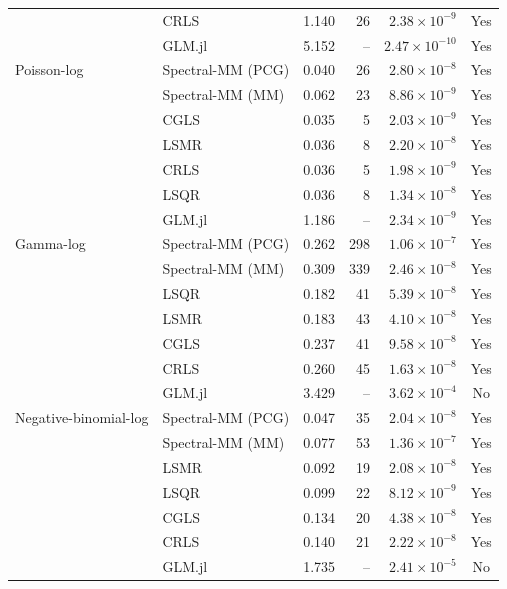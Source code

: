 \begin{table}[htbp]
\begin{tabular}{llrrrc}
 & CRLS & 1.140 & 26 & $2.38\times10^{-9}$ & Yes \\
 & GLM.jl & 5.152 & -- & $2.47\times10^{-10}$ & Yes \\
\midrule
Poisson-log & Spectral-MM (PCG) & 0.040 & 26 & $2.80\times10^{-8}$ & Yes \\
 & Spectral-MM (MM) & 0.062 & 23 & $8.86\times10^{-9}$ & Yes \\
 & CGLS & 0.035 & 5 & $2.03\times10^{-9}$ & Yes \\
 & LSMR & 0.036 & 8 & $2.20\times10^{-8}$ & Yes \\
 & CRLS & 0.036 & 5 & $1.98\times10^{-9}$ & Yes \\
 & LSQR & 0.036 & 8 & $1.34\times10^{-8}$ & Yes \\
 & GLM.jl & 1.186 & -- & $2.34\times10^{-9}$ & Yes \\
\midrule
Gamma-log & Spectral-MM (PCG) & 0.262 & 298 & $1.06\times10^{-7}$ & Yes \\
 & Spectral-MM (MM) & 0.309 & 339 & $2.46\times10^{-8}$ & Yes \\
 & LSQR & 0.182 & 41 & $5.39\times10^{-8}$ & Yes \\
 & LSMR & 0.183 & 43 & $4.10\times10^{-8}$ & Yes \\
 & CGLS & 0.237 & 41 & $9.58\times10^{-8}$ & Yes \\
 & CRLS & 0.260 & 45 & $1.63\times10^{-8}$ & Yes \\
 & GLM.jl & 3.429 & -- & $3.62\times10^{-4}$ & No \\
\midrule
Negative-binomial-log & Spectral-MM (PCG) & 0.047 & 35 & $2.04\times10^{-8}$ & Yes \\
 & Spectral-MM (MM) & 0.077 & 53 & $1.36\times10^{-7}$ & Yes \\
 & LSMR & 0.092 & 19 & $2.08\times10^{-8}$ & Yes \\
 & LSQR & 0.099 & 22 & $8.12\times10^{-9}$ & Yes \\
 & CGLS & 0.134 & 20 & $4.38\times10^{-8}$ & Yes \\
 & CRLS & 0.140 & 21 & $2.22\times10^{-8}$ & Yes \\
 & GLM.jl & 1.735 & -- & $2.41\times10^{-5}$ & No \\
\bottomrule
\end{tabular}
\end{table}
